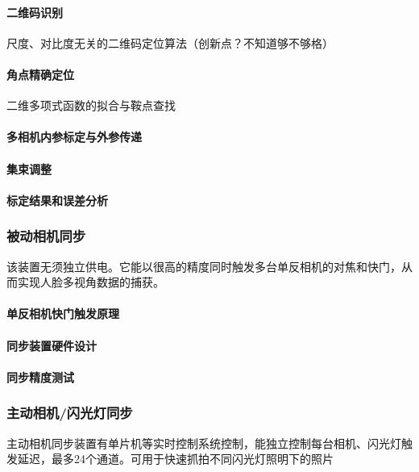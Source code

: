 \documentclass{ctexart}
\begin{document}
\paragraph{二维码识别}尺度、对比度无关的二维码定位算法（创新点？不知道够不够格）

\paragraph{角点精确定位}二维多项式函数的拟合与鞍点查找

\paragraph{多相机内参标定与外参传递}

\paragraph{集束调整}

\paragraph{标定结果和误差分析}

\subsubsection{被动相机同步}

该装置无须独立供电。它能以很高的精度同时触发多台单反相机的对焦和快门，从而实现人脸多视角数据的捕获。

\paragraph{单反相机快门触发原理}

\paragraph{同步装置硬件设计}

\paragraph{同步精度测试}

\subsubsection{主动相机/闪光灯同步}

主动相机同步装置有单片机等实时控制系统控制，能独立控制每台相机、闪光灯触发延迟，最多24个通道。可用于快速抓拍不同闪光灯照明下的照片
\end{document}
